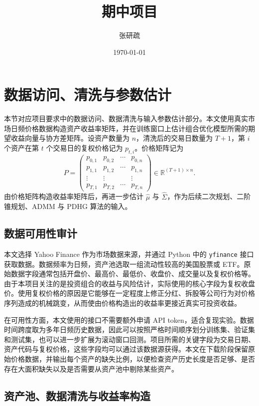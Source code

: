 \documentclass[UTF8,12pt]{ctexart}
\title{期中项目}
\author{张研疏 \quad 2200010823}
\date{\today}
\begin{document}
\maketitle

\section{数据访问、清洗与参数估计}

本节对应项目要求中的数据访问、数据清洗与输入参数估计部分。本文使用真实市场日频价格数据构造资产收益率矩阵，并在训练窗口上估计组合优化模型所需的期望收益向量与协方差矩阵。设资产数量为 $n$，清洗后的交易日数量为 $T+1$，第 $i$ 个资产在第 $t$ 个交易日的复权价格记为 $p_{t,i}$。价格矩阵记为
\[
P=
\begin{pmatrix}
p_{0,1} & p_{0,2} & \cdots & p_{0,n}\\
p_{1,1} & p_{1,2} & \cdots & p_{1,n}\\
\vdots & \vdots & & \vdots\\
p_{T,1} & p_{T,2} & \cdots & p_{T,n}
\end{pmatrix}\in\mathbb{R}^{(T+1)\times n}.
\]
由价格矩阵构造收益率矩阵后，再进一步估计 $\hat\mu$ 与 $\hat\Sigma$，作为后续二次规划、二阶锥规划、ADMM 与 PDHG 算法的输入。

\subsection{数据可用性审计}

本文选择 Yahoo Finance 作为市场数据来源，并通过 Python 中的 \texttt{yfinance} 接口获取数据。数据频率为日频，资产池选取一组流动性较高的美国股票或 ETF。原始数据字段通常包括开盘价、最高价、最低价、收盘价、成交量以及复权价格等。由于本项目关注的是投资组合的收益与风险估计，实际使用的核心字段为复权收盘价。使用复权价格的原因是它能够在一定程度上修正分红、拆股等公司行为对价格序列造成的机械跳变，从而使由价格构造出的收益率更接近真实可投资收益。

在可用性方面，本文使用的接口不需要额外申请 API token，适合复现实验。数据时间跨度取为多年日频历史数据，因此可以按照严格时间顺序划分训练集、验证集和测试集，也可以进一步扩展为滚动窗口回测。项目所需的关键字段为交易日期、资产代码与复权价格，这些字段均可以通过该数据源获得。本文在下载阶段保留原始价格数据，并输出每个资产的缺失比例，以便检查资产历史长度是否足够、是否存在大面积缺失以及是否需要从资产池中剔除某些资产。

\subsection{资产池、数据清洗与收益率构造}
\end{document}
